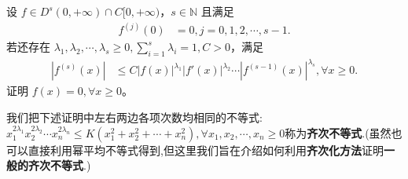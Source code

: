\documentclass[../../main.tex]{subfiles}
\begin{document}
\begin{proposition}\label{proposition:齐次化方法/关于导数乘积不等式问题}
设 $f \in D^s(0,+\infty) \cap C[0,+\infty)$，$s \in \mathbb{N}$ 且满足
\begin{align*}
f^{(j)}(0) &= 0, j = 0, 1, 2, \cdots, s - 1.
\end{align*}
若还存在 $\lambda_1, \lambda_2, \cdots, \lambda_s \geqslant  0, \sum_{i=1}^{s} \lambda_i = 1, C > 0$，满足
\begin{align}\label{example7.10-0.1}
\left| f^{(s)}(x) \right| &\leqslant  C \left| f(x) \right|^{\lambda_1} \left| f'(x) \right|^{\lambda_2} \cdots \left| f^{(s-1)}(x) \right|^{\lambda_s}, \forall x \geqslant  0.
\end{align}
证明 $f(x) = 0, \forall x \geqslant  0$。
\end{proposition}
\begin{note}
我们把下述证明中左右两边各项次数均相同的不等式:$x_{1}^{2\lambda _1}x_{2}^{2\lambda _2}\cdots x_{n}^{2\lambda _n}\leqslant K\left( x_{1}^{2}+x_{2}^{2}+\cdots +x_{n}^{2} \right) ,\forall x_1,x_2,\cdots ,x_n\geqslant 0$称为\textbf{齐次不等式}.(虽然也可以直接利用幂平均不等式得到,但这里我们旨在介绍如何利用\textbf{齐次化方法}证明\textbf{一般的齐次不等式}.)
\end{note}
\end{document}
